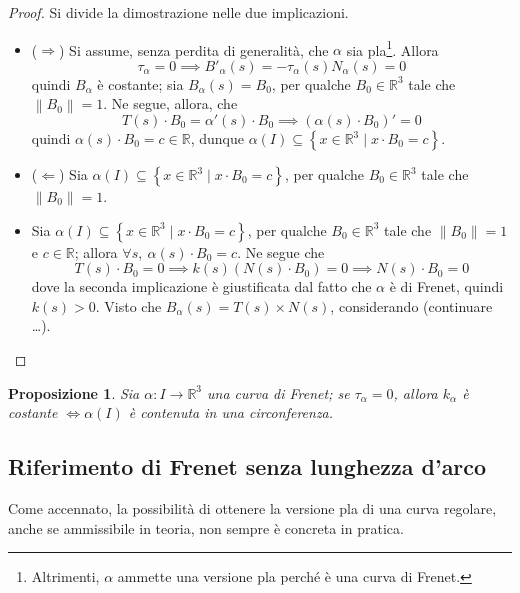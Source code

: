 \documentclass[12pt]{scrartcl}
\theoremstyle{style}
\newtheorem{prop}{Proposizione}[section]
\numberwithin{equation}{subsection}
\begin{document}
	\begin{proof}
		Si divide la dimostrazione nelle due implicazioni.
		\begin{itemize}
			\item ($\Rightarrow $) Si assume, senza perdita di generalit\`a, che $\alpha $ sia pla\footnote{Altrimenti, $\alpha $ ammette una versione pla perch\'e \`e una curva di Frenet.}.
				Allora 
				\[
				\tau _\alpha  = 0 \implies B'_\alpha (s) = - \tau _\alpha (s) N_\alpha (s) = 0 
				\] 
				quindi $B_\alpha $ \`e costante; sia $B_\alpha (s) = B_0$, per qualche $B_0\in \mathbb{R}^3$ tale che $\left\lVert B_0 \right\rVert =1$.
				Ne segue, allora, che
				\[
				T(s) \cdot B_0 = \alpha '(s) \cdot B_0\implies (\alpha (s) \cdot B_0)' = 0
				\] 
				quindi $\alpha (s)\cdot B_0 = c \in \mathbb{R}$, dunque $\alpha (I) \subseteq \left\{ x \in \mathbb{R}^3  \mid x\cdot B_0 = c \right\} $.
			\item ($\Leftarrow$) Sia $\alpha (I) \subseteq \left\{ x \in \mathbb{R}^3  \mid  x \cdot B_0 = c \right\} $, per qualche $B_0 \in \mathbb{R}^3$ tale che $\left\lVert B_0 \right\rVert =1$.
			\item Sia $\alpha (I) \subseteq \left\{ x \in \mathbb{R}^3  \mid x\cdot B_0 =c  \right\} $, per qualche $B_0 \in \mathbb{R}^3$ tale che $\left\lVert B_0  \right\rVert  = 1$ e $c \in \mathbb{R}$; allora $\forall s, \ \alpha (s) \cdot B_0 = c$.
				Ne segue che
				\[
				T(s) \cdot B_0 = 0 \implies k(s) (N(s) \cdot B_0) = 0 \implies N(s) \cdot B_0 = 0
				\] 
				dove la seconda implicazione \`e giustificata dal fatto che $\alpha $ \`e di Frenet, quindi $k(s) > 0 $.
				Visto che $B_\alpha (s) = T(s) \times N(s)$, considerando (continuare \ldots).
		\end{itemize}
	\end{proof}
\begin{prop}
	Sia $\alpha : I \to \mathbb{R}^3$ una curva di Frenet; se $\tau _\alpha  = 0$, allora $k_\alpha $ \`e costante $\iff \alpha (I)$ \`e contenuta in una circonferenza.
\end{prop}
\subsection{Riferimento di Frenet senza lunghezza d'arco}
Come accennato, la possibilit\`a di ottenere la versione pla di una curva regolare, anche se ammissibile in teoria, non sempre \`e concreta in pratica.
\end{document}
